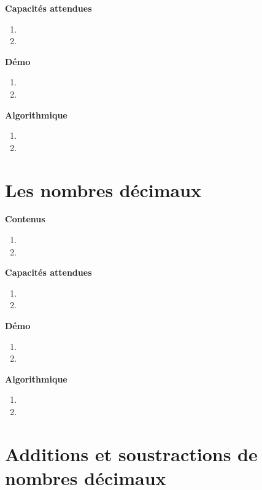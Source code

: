 \documentclass[10pt,a4paper]{article}
\begin{document}
\textbf{Capacités attendues}

\begin{enumerate}
\item 
\item 
\end{enumerate}

\textbf{Démo}

\begin{enumerate}
\item 
\item 
\end{enumerate}

\textbf{Algorithmique}

\begin{enumerate}
\item 
\item 
\end{enumerate}

\section{Les nombres décimaux}

\textbf{Contenus}

\begin{enumerate} 
\item 
\item 
\end{enumerate}


\textbf{Capacités attendues}

\begin{enumerate}
\item 
\item 
\end{enumerate}

\textbf{Démo}

\begin{enumerate}
\item 
\item 
\end{enumerate}

\textbf{Algorithmique}

\begin{enumerate}
\item 
\item 
\end{enumerate}

\section{Additions et soustractions de nombres décimaux}
\end{document}
